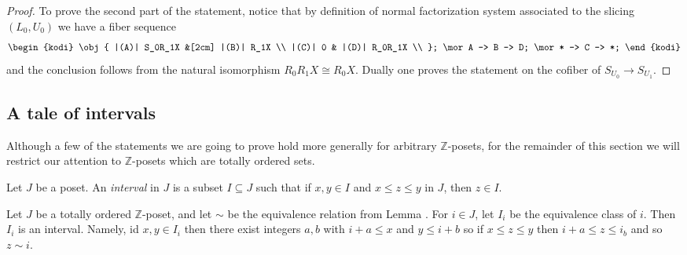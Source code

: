\begin{remark}
\begin{proof}
To prove the second part of the statement, notice that by definition of normal factorization system associated to the slicing $(L_0,U_0)$ we have a fiber sequence
\[
\begin{kodi}
\obj{
|(A)| S_0R_1X &[2cm] |(B)| R_1X  \\
|(C)| 0 & |(D)| R_0R_1X  \\
};
\mor A -> B -> D;
\mor * -> C -> *;
\end{kodi}
\]
and the conclusion follows from the natural isomorphism $R_0R_1X\cong R_0X$. Dually one proves the statement on the cofiber of $S_{U_0}\to S_{U_1}$.
\end{proof}



\end{remark}

\subsection{A tale of intervals}
Although a few of the statements we are going to prove hold more generally for arbitrary $\mathbb{Z}$-posets, for the remainder of this section we will restrict our attention to $\mathbb{Z}$-posets which are totally ordered sets.
\begin{definition}
Let $J$ be a poset. An \emph{interval} in $J$ is a subset $I\subseteq J$ such that if $x,y\in I$ and $x\leq z\leq y$ in $J$, then $z\in I$.
\end{definition}

\begin{example}\label{class.is.interval}
Let $J$ be a totally ordered $\mathbb{Z}$-poset, and let $\sim$ be the equivalence relation from Lemma . For $i\in J$, let $I_i$ be the equivalence class of $i$. Then $I_i$ is an interval. Namely, id $x,y\in I_i$ then there exist integers $a,b$ with $i+a\leq x$ and $y\leq i+b$ so if $x\leq z\leq y$ then $i+a\leq z\leq i_b$ and so $z\sim i$.
\end{example}

